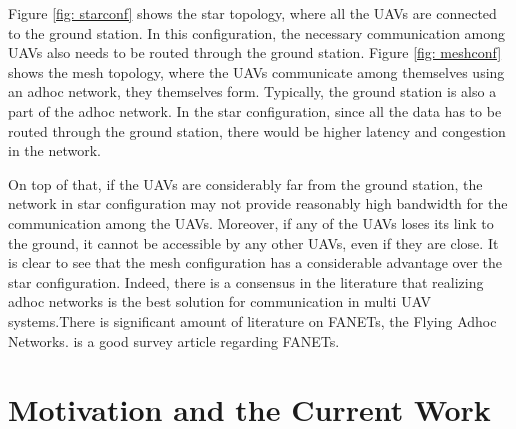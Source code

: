 Figure \ref{fig: starconf} shows the star topology, where all the UAVs are connected to the ground station. In this configuration, the necessary communication among UAVs also needs to be routed through the ground station. Figure \ref{fig: meshconf} shows the mesh topology, where the UAVs communicate among themselves using an adhoc network, they themselves form. Typically, the ground station is also a part of the adhoc network. In the star configuration, since all the data has to be routed through the ground station, there would be higher latency and congestion in the network.

On top of that, if the UAVs are considerably far from the ground station, the network in star configuration may not provide reasonably high bandwidth for the communication among the UAVs. Moreover, if any of the UAVs loses its link to the ground, it cannot be accessible by any other UAVs, even if they are close. It is clear to see that the mesh configuration has a considerable advantage over the star configuration. Indeed, there is a consensus in the literature that realizing adhoc networks is the best solution for communication in multi UAV systems.There is significant amount of literature on FANETs, the Flying Adhoc Networks.  \cite{fanets} is a good survey article regarding FANETs.

\section{Motivation and the Current Work}